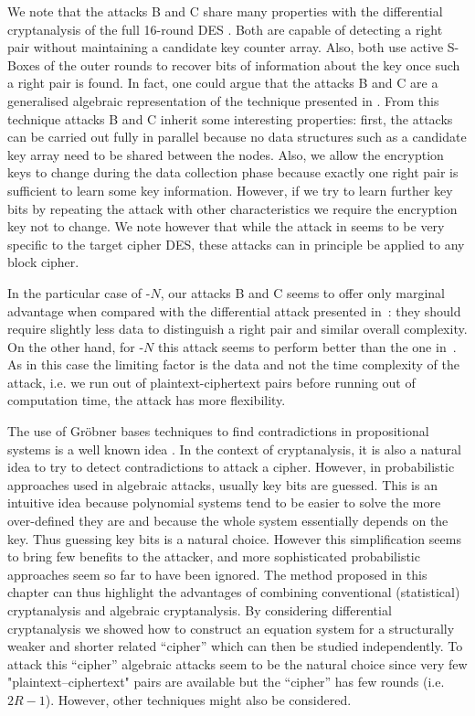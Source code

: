 We note that the attacks B and C share many properties with the differential cryptanalysis of the full 16-round DES \cite{fulldes-dc}. Both are capable of detecting a right pair without maintaining a candidate key counter array. Also, both use active S-Boxes of the outer rounds to recover bits of information about the key once such a right pair is found. In fact, one could argue that the attacks B and C are a generalised algebraic representation of the technique presented in \cite{fulldes-dc}. From this technique attacks B and C inherit some interesting properties: first, the attacks can be carried out fully in parallel because no data structures such as a candidate key array need to be shared between the nodes. Also, we allow the encryption keys to change during the data collection phase because exactly one right pair is sufficient to learn some key information. However, if we try to learn further key bits by repeating the attack with other characteristics we require the encryption key not to change. We note however that while the attack in \cite{fulldes-dc} seems to be very specific to the target cipher DES, these attacks can in principle be applied to any block cipher. 

In the particular case of -$N$, our attacks B and C seems to offer only marginal advantage when compared with the differential attack presented in~\cite{present-dc:africacrypt}: they should require slightly less data to distinguish a right pair and similar overall complexity. On the other hand, for -$N$ this attack seems to perform better than the one in~\cite{present-dc:africacrypt}. As in this case the limiting factor is the data and not the time complexity of the attack, i.e. we run out of plaintext-ciphertext pairs before running out of computation time, the attack has more flexibility. 

The use of Gr\"obner bases techniques to find contradictions in propositional systems is a well known idea \cite{Clegg1996}. In the context of cryptanalysis, it is also a natural idea to try to detect contradictions to attack a cipher. However, in probabilistic approaches used in algebraic attacks, usually key bits are guessed. This is an intuitive idea because polynomial systems tend to be easier to solve the more over-defined they are and because the whole system essentially depends on the key. Thus guessing key bits is a natural choice. However this simplification seems to bring few benefits to the attacker, and more sophisticated probabilistic approaches seem so far to have been ignored. The method proposed in this chapter can thus highlight the advantages of combining conventional (statistical) cryptanalysis and algebraic cryptanalysis. By considering differential cryptanalysis we showed how to construct an equation system for a structurally weaker and shorter related ``cipher'' which can then be studied independently. To attack this ``cipher'' algebraic attacks seem to be the natural choice since very few "plaintext--ciphertext" pairs are available but the ``cipher'' has few rounds (i.e. $2R-1$). However, other techniques might also be considered.

